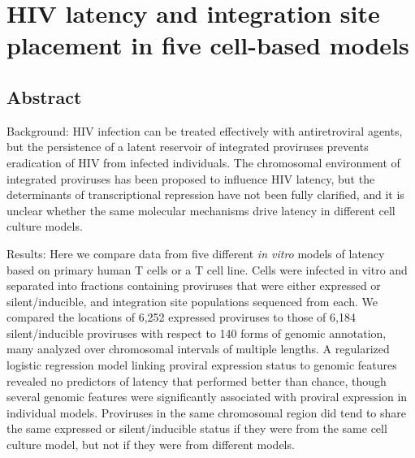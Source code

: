 \documentclass[../sherrill-Mix_thesis.tex]{subfiles}
\begin{document}
\graphicspath{{im/}{latency/im/}}

\newcommand{\Active}{Active \cdFour} %
\newcommand{\Resting}{Resting \cdFour}
\newcommand{\Memory}{Central Memory \cdFour}
\newcommand{\Bcl}{Bcl-2 transduced \cdFour}
\newcommand{\Jurkat}{Jurkat}
\newcommand{\nFeatures}{140}
\newcommand{\nSites}{12,436}


\chapter{HIV latency and integration site placement in five cell-based models}
\label{chapLatency}
 

\section{Abstract}
	Background: HIV infection can be treated effectively with antiretroviral agents, but the persistence of a latent reservoir of integrated proviruses prevents eradication of HIV from infected individuals. The chromosomal environment of integrated proviruses has been proposed to influence HIV latency, but the determinants of transcriptional repression have not been fully clarified, and it is unclear whether the same molecular mechanisms drive latency in different cell culture models. 

	Results: Here we compare data from five different \textit{in vitro} models of latency based on primary human T cells or a T cell line.  Cells were infected in vitro and separated into fractions containing proviruses that were either expressed or silent/inducible, and integration site populations sequenced from each. We compared the locations of 6,252 expressed proviruses to those of 6,184 silent/inducible proviruses with respect to 140 forms of genomic annotation, many analyzed over chromosomal intervals of multiple lengths. A regularized logistic regression model linking proviral expression status to genomic features revealed no predictors of latency that performed better than chance, though several genomic features were significantly associated with proviral expression in individual models.  Proviruses in the same chromosomal region did tend to share the same expressed or silent/inducible status if they were from the same cell culture model, but not if they were from different models. 
	
\end{document}
